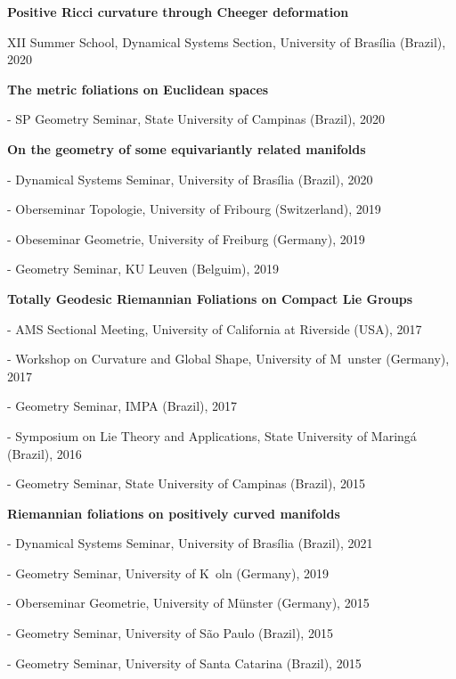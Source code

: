 \documentclass[10pt]{article}
\newenvironment{innerlist}[1][\enskip\textbullet]%
        {\begin{compactitem}[#1]}{\end{compactitem}}
\newcommand{\blankline}{\quad\pagebreak[2]}
\begin{document}
\textbf{ Positive Ricci curvature through Cheeger deformation  }
\begin{innerlist}
\item[] XII Summer School, Dynamical Systems Section,  University of Brasília (Brazil), 2020
\end{innerlist}

\blankline

\textbf{ The metric foliations on Euclidean spaces }
\begin{innerlist}
	\item[]- SP Geometry Seminar, State University of Campinas (Brazil), 2020
\end{innerlist}




\blankline

\textbf{ On the geometry of some equivariantly related manifolds }
\begin{innerlist}
\item[]- Dynamical Systems Seminar, University of Brasília (Brazil), 2020
\item[]- Oberseminar Topologie, University of Fribourg (Switzerland), 2019
\item[]- Obeseminar Geometrie, University of Freiburg (Germany), 2019
\item[]- Geometry Seminar, KU Leuven (Belguim), 2019
\end{innerlist}



\blankline

\textbf{ Totally Geodesic Riemannian Foliations on Compact Lie Groups }
\begin{innerlist}
\item[]- AMS Sectional Meeting, University of California at Riverside (USA), 2017
\item[]- Workshop on Curvature and Global Shape, University of M\ unster (Germany), 2017
\item[]- Geometry Seminar, IMPA (Brazil), 2017
\item[]- Symposium on Lie Theory and Applications, State University of Maringá (Brazil), 2016
\item[]- Geometry Seminar, State University of Campinas (Brazil), 2015
\end{innerlist}


\blankline

\textbf{ Riemannian foliations on positively curved manifolds }
\begin{innerlist}
	\item[]- Dynamical Systems Seminar, University of Brasília (Brazil), 2021
\item[]- Geometry Seminar, University of K\ oln (Germany), 2019
\item[]- Oberseminar Geometrie, University of M\"unster (Germany), 2015
\item[]- Geometry Seminar, University of São Paulo (Brazil), 2015
\item[]- Geometry Seminar, University of Santa Catarina (Brazil), 2015
\end{innerlist}
\end{document}
